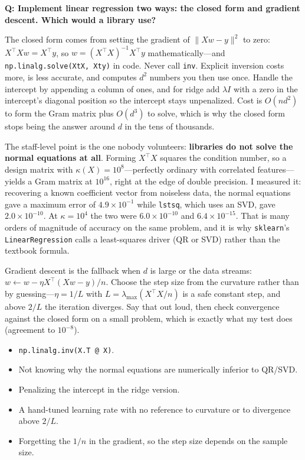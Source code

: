 \begin{interviewq}
\textbf{Q: Implement linear regression two ways: the closed form and gradient descent. Which would a library use?}

 \quad {} \quad \badgefreq{\freqmed}

\stronganswer

The closed form comes from setting the gradient of $\|Xw - y\|^2$ to zero: $X^\top X w = X^\top y$, so $w = (X^\top X)^{-1}X^\top y$ mathematically---and \texttt{np.linalg.solve(XtX, Xty)} in code. Never call \texttt{inv}. Explicit inversion costs more, is less accurate, and computes $d^2$ numbers you then use once. Handle the intercept by appending a column of ones, and for ridge add $\lambda I$ with a zero in the intercept's diagonal position so the intercept stays unpenalized. Cost is $O(nd^2)$ to form the Gram matrix plus $O(d^3)$ to solve, which is why the closed form stops being the answer around $d$ in the tens of thousands.

The staff-level point is the one nobody volunteers: \textbf{libraries do not solve the normal equations at all}. Forming $X^\top X$ squares the condition number, so a design matrix with $\kappa(X) = 10^8$---perfectly ordinary with correlated features---yields a Gram matrix at $10^{16}$, right at the edge of double precision. I measured it: recovering a known coefficient vector from noiseless data, the normal equations gave a maximum error of $4.9 \times 10^{-1}$ while \texttt{lstsq}, which uses an SVD, gave $2.0 \times 10^{-10}$. At $\kappa = 10^4$ the two were $6.0\times10^{-10}$ and $6.4\times10^{-15}$. That is many orders of magnitude of accuracy on the same problem, and it is why \texttt{sklearn}'s \texttt{LinearRegression} calls a least-squares driver (QR or SVD) rather than the textbook formula.

Gradient descent is the fallback when $d$ is large or the data streams: $w \leftarrow w - \eta X^\top(Xw - y)/n$. Choose the step size from the curvature rather than by guessing---$\eta = 1/L$ with $L = \lambda_{\max}(X^\top X/n)$ is a safe constant step, and above $2/L$ the iteration diverges. Say that out loud, then check convergence against the closed form on a small problem, which is exactly what my test does (agreement to $10^{-8}$).

\redflags
\begin{itemize}
    \item \texttt{np.linalg.inv(X.T @ X)}.
    \item Not knowing why the normal equations are numerically inferior to QR/SVD.
    \item Penalizing the intercept in the ridge version.
    \item A hand-tuned learning rate with no reference to curvature or to divergence above $2/L$.
    \item Forgetting the $1/n$ in the gradient, so the step size depends on the sample size.
\end{itemize}


\end{interviewq}
